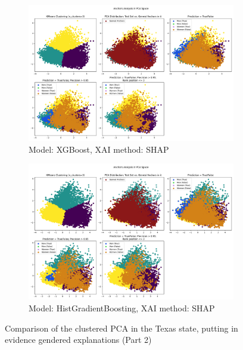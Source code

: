 \begin{figure}[h]
    \ContinuedFloat
    \begin{subfigure}[b]{1.0\textwidth}
        \includegraphics[width=\textwidth]{Images/clustered_pca/clusters_xg_tx_shap.png}
        \caption{Model: XGBoost, XAI method: SHAP}
        \label{fig:clusters_xg_tx_shap}
    \end{subfigure}

    \begin{subfigure}[b]{1.0\textwidth}
        \includegraphics[width=\textwidth]{Images/clustered_pca/clusters_skrub_tx_shap.png}
        \caption{Model: HistGradientBoosting, XAI method: SHAP}
        \label{fig:clusters_skrub_tx_shap}
    \end{subfigure}

    \caption{Comparison of the clustered PCA in the Texas state, putting in evidence gendered explanations (Part 2)}
    \label{fig:clusters_tx}
\end{figure}